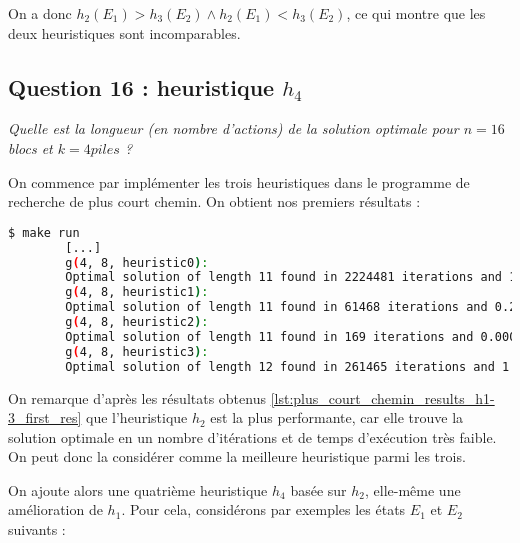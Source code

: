 On a donc $h_2(E_1) > h_3(E_2) \land h_2(E_1) < h_3(E_2)$, ce qui montre que les deux heuristiques sont incomparables.

\subsection{Question 16 : heuristique $h_4$}

\textit{Quelle est la longueur (en nombre d'actions) de la solution optimale pour $n = 16$ blocs et $k = 4 piles$ ?}

On commence par implémenter les trois heuristiques dans le programme de recherche de plus court chemin. On obtient nos premiers résultats :

\begin{minipage}{\dimexpr\linewidth-20pt}
    \begin{lstlisting}[language=bash, caption={Résultats de l'exécution du programme de recherche de plus court chemin avec 3 premières heuristiques pour $k = 4$ piles et $n = 8$ blocs.}, label={lst:plus_court_chemin_results_h1-3_first_res}]
        $ make run
        [...]
        g(4, 8, heuristic0): 
        Optimal solution of length 11 found in 2224481 iterations and 15.1703 seconds
        g(4, 8, heuristic1): 
        Optimal solution of length 11 found in 61468 iterations and 0.242329 seconds
        g(4, 8, heuristic2): 
        Optimal solution of length 11 found in 169 iterations and 0.000934 seconds
        g(4, 8, heuristic3): 
        Optimal solution of length 12 found in 261465 iterations and 1.12496 seconds
    \end{lstlisting}
\end{minipage}

On remarque d'après les résultats obtenus \ref{lst:plus_court_chemin_results_h1-3_first_res} que l'heuristique $h_2$ est la plus performante, car elle trouve la solution optimale en un nombre d'itérations et de temps d'exécution très faible. On peut donc la considérer comme la meilleure heuristique parmi les trois.

On ajoute alors une quatrième heuristique $h_4$ basée sur $h_2$, elle-même une amélioration de $h_1$. Pour cela, considérons par exemples les états $E_1$ et $E_2$ suivants :

